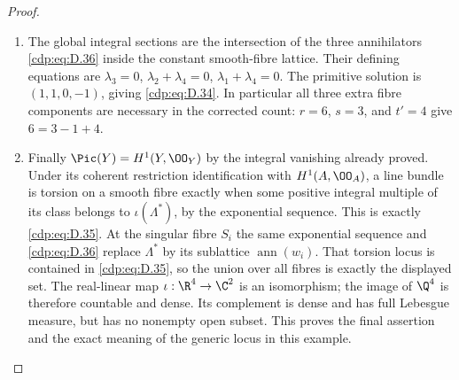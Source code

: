 \begin{proof}
\begin{enumerate}[label={$\langle1\rangle$\arabic*.},leftmargin=*]
\item The global integral sections are the intersection of
the three annihilators \eqref{cdp:eq:D.36} inside the constant
smooth-fibre lattice. Their defining equations are
$\lambda_3=0$, $\lambda_2+\lambda_4=0$,
$\lambda_1+\lambda_4=0$. The primitive solution is
$(1,1,0,-1)$, giving \eqref{cdp:eq:D.34}. In particular all three
extra fibre components are necessary in the corrected
count: $r=6$, $s=3$, and $t'=4$ give
$6=3-1+4$.

\item Finally $\Pic(Y)=H^1(Y,\OO_Y)$ by the integral vanishing
already proved. Under its coherent restriction
identification with $H^1(A,\OO_A)$, a line bundle is
torsion on a smooth fibre exactly when some positive
integral multiple of its class belongs to
$\iota(\Lambda^*)$, by the exponential sequence.
This is exactly \eqref{cdp:eq:D.35}. At the singular fibre $S_i$
the same exponential sequence and \eqref{cdp:eq:D.36} replace
$\Lambda^*$ by its sublattice $\operatorname{ann}(w_i)$.
That torsion locus is contained in \eqref{cdp:eq:D.35}, so the union
over all fibres is exactly the displayed set. The
real-linear map $\iota:\R^4\to\C^2$ is an isomorphism;
the image of $\Q^4$ is therefore countable and dense.
Its complement is dense and has full Lebesgue measure,
but has no nonempty open subset. This proves the final
assertion and the exact meaning of the generic locus
in this example.

\end{enumerate}
\end{proof}
